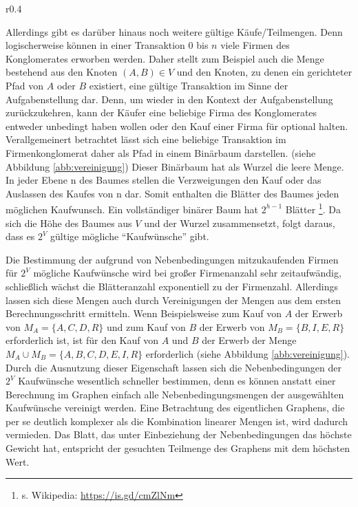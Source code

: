 \begin{wrapfigure}{r}{0.4\textwidth}
  \begin{center}
	\sidesubfloat[]{}
    \vspace{2em}
    \sidesubfloat[]{}
  \end{center}
  \caption{Beispielgraph und binärer Baum}
  \label{abb:vereinigung}
\end{wrapfigure}
Allerdings gibt es darüber hinaus noch weitere gültige Käufe/Teilmengen. Denn logischerweise können in einer Transaktion 0 bis \(n\) viele Firmen des Konglomerates erworben werden. Daher stellt zum Beispiel auch die Menge bestehend aus den Knoten \((A, B) \in V\) und den Knoten, zu denen ein gerichteter Pfad von \(A\) oder \(B\) existiert, eine gültige Transaktion im Sinne der Aufgabenstellung dar.
Denn, um wieder in den Kontext der Aufgabenstellung zurückzukehren, kann der Käufer eine beliebige Firma des Konglomerates entweder unbedingt haben wollen oder den Kauf einer Firma für optional halten. 
Verallgemeinert betrachtet lässt sich eine beliebige Transaktion im Firmenkonglomerat daher als Pfad in einem Binärbaum darstellen. (siehe Abbildung \ref{abb:vereinigung})
Dieser Binärbaum hat als Wurzel die leere Menge. In jeder Ebene n des Baumes stellen die Verzweigungen den Kauf oder das Auslassen des Kaufes von n dar. Somit enthalten die Blätter des Baumes jeden möglichen Kaufwunsch. Ein vollständiger binärer Baum hat \(2^{h-1}\) Blätter \footnote{s. Wikipedia: \url{https://is.gd/cmZlNm}}. Da sich die Höhe des Baumes aus \(V\) und der Wurzel zusammensetzt, folgt daraus, dass es \(2^V\) gültige mögliche "`Kaufwünsche"' gibt.

Die Bestimmung der aufgrund von Nebenbedingungen mitzukaufenden Firmen für \(2^V\) mögliche Kaufwünsche wird bei großer Firmenanzahl sehr zeitaufwändig, schließlich wächst die Blätteranzahl exponentiell zu der Firmenzahl. Allerdings lassen sich diese Mengen auch durch Vereinigungen der Mengen aus dem ersten Berechnungsschritt ermitteln.
Wenn Beispielsweise zum Kauf von \(A\) der Erwerb von \(M_A=\{A, C, D, R\}\) und zum Kauf von \(B\) der Erwerb von \(M_B = \{B, I, E, R\}\) erforderlich ist, ist für den Kauf von \(A\) und \(B\) der Erwerb der Menge \(M_A \cup M_B = \{A, B, C, D, E, I, R\}\) erforderlich (siehe Abbildung \ref{abb:vereinigung}).
Durch die Ausnutzung dieser Eigenschaft lassen sich die Nebenbedingungen der \(2^V\) Kaufwünsche wesentlich schneller bestimmen, denn es können anstatt einer Berechnung im Graphen einfach alle Nebenbedingungsmengen der ausgewählten Kaufwünsche vereinigt werden.
Eine Betrachtung des eigentlichen Graphens, die per se deutlich komplexer als  die Kombination linearer Mengen ist, wird dadurch vermieden.
Das Blatt, das unter Einbeziehung der Nebenbedingungen das höchste Gewicht hat, entspricht der gesuchten Teilmenge des Graphens mit dem höchsten Wert.

